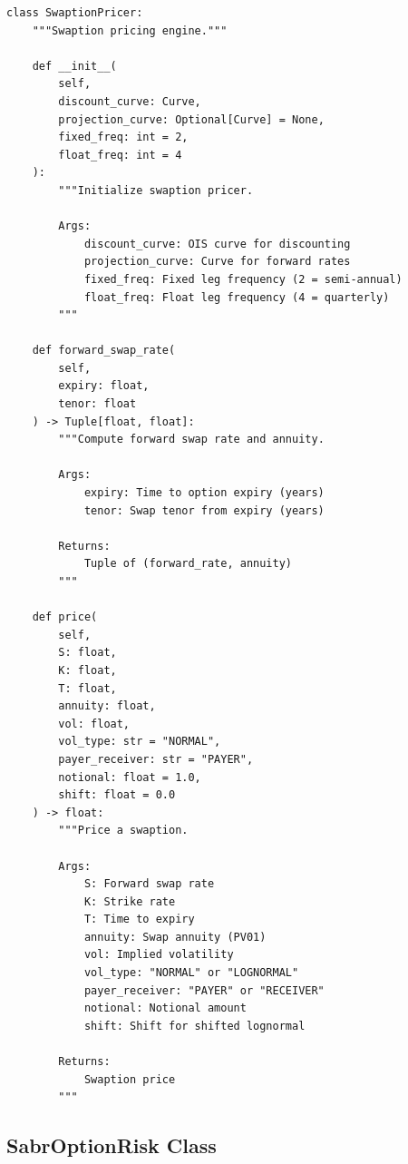 \documentclass[12pt,a4paper]{report}
\begin{document}
\begin{lstlisting}
class SwaptionPricer:
    """Swaption pricing engine."""
    
    def __init__(
        self,
        discount_curve: Curve,
        projection_curve: Optional[Curve] = None,
        fixed_freq: int = 2,
        float_freq: int = 4
    ):
        """Initialize swaption pricer.
        
        Args:
            discount_curve: OIS curve for discounting
            projection_curve: Curve for forward rates
            fixed_freq: Fixed leg frequency (2 = semi-annual)
            float_freq: Float leg frequency (4 = quarterly)
        """
    
    def forward_swap_rate(
        self,
        expiry: float,
        tenor: float
    ) -> Tuple[float, float]:
        """Compute forward swap rate and annuity.
        
        Args:
            expiry: Time to option expiry (years)
            tenor: Swap tenor from expiry (years)
            
        Returns:
            Tuple of (forward_rate, annuity)
        """
    
    def price(
        self,
        S: float,
        K: float,
        T: float,
        annuity: float,
        vol: float,
        vol_type: str = "NORMAL",
        payer_receiver: str = "PAYER",
        notional: float = 1.0,
        shift: float = 0.0
    ) -> float:
        """Price a swaption.
        
        Args:
            S: Forward swap rate
            K: Strike rate
            T: Time to expiry
            annuity: Swap annuity (PV01)
            vol: Implied volatility
            vol_type: "NORMAL" or "LOGNORMAL"
            payer_receiver: "PAYER" or "RECEIVER"
            notional: Notional amount
            shift: Shift for shifted lognormal
            
        Returns:
            Swaption price
        """
\end{lstlisting}

\subsection{SabrOptionRisk Class}
\end{document}
